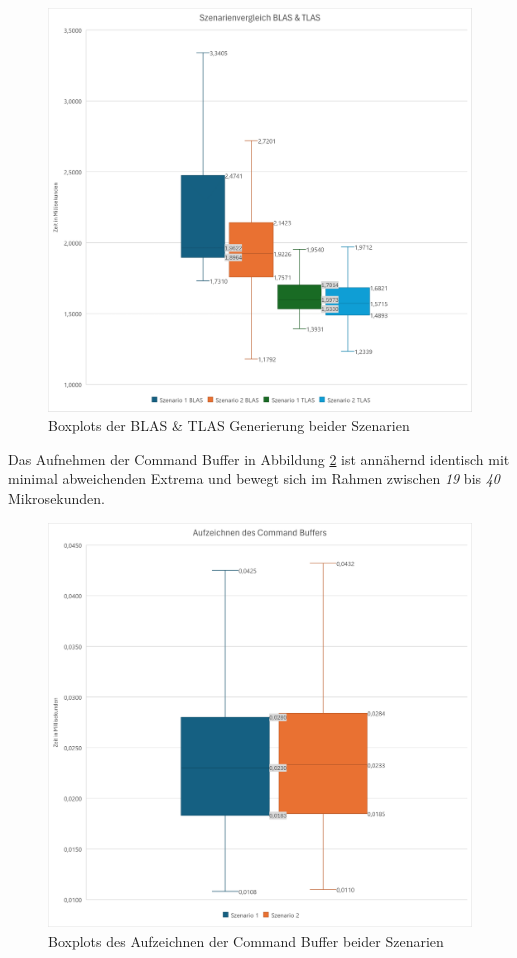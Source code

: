 \documentclass[11pt]{scrartcl}
\begin{document}
	\begin{figure}[h!]
		\centering
		\includegraphics[width=0.7\linewidth]{Figures/rt_blas_tlas_comp.png}
		\caption[Szenarienvergleich BLAS \& TLAS Erstellung]{Boxplots der BLAS \& TLAS Generierung beider Szenarien}
		\label{fig:blastlascomp}
	\end{figure}
	
	\pagebreak
	
	Das Aufnehmen der Command Buffer in Abbildung \ref{fig:cmdbufcomp} ist annähernd identisch mit minimal abweichenden Extrema und bewegt sich im Rahmen zwischen \textit{19} bis \textit{40} Mikrosekunden.

	\begin{figure}[h!]
		\centering
		\includegraphics[width=0.7\linewidth]{Figures/rt_cmdbuf_comp.png}
		\caption[Szenarienvergleich Command Buffer Aufzeichnung]{Boxplots des Aufzeichnen der Command Buffer beider Szenarien}
		\label{fig:cmdbufcomp}
	\end{figure}
	
\end{document}
